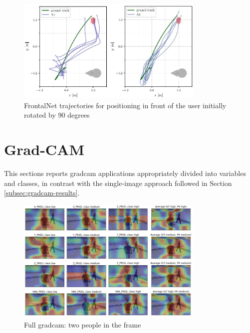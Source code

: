 \begin{figure}[!htb]
	\centering
	\includegraphics[width=0.8\textwidth]{"contents/images/03-frontalnet-trajectories"}
	\caption[FrontalNet trajectories for positioning in front of the user initially rotated by 90 degrees \cite{mantegazza2019visionbased}]{FrontalNet trajectories for positioning in front of the user initially rotated by 90 degrees \cite{mantegazza2019visionbased}}
	\label{fig:frontalnet-trajectories}
\end{figure}

\clearpage


\section{Grad-CAM}
\label{sec:extra-gradcam}

This sections reports \gls{gradcam} applications appropriately divided into variables and classes, in contrast with the single-image approach followed in Section \ref{subsec:gradcam-results}.

\begin{figure}[!h]
	\centering
	\includegraphics[width=0.8\textwidth]{"contents/images/gradcam/apx-gradcam-1"}
	\caption[Full \gls{gradcam}: two people in the frame]{Full \gls{gradcam}: two people in the frame}
	\label{fig:apx-gradcam-1}
\end{figure}

